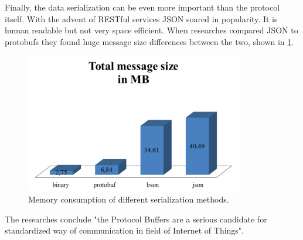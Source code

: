 Finally, the data serialization can be even more important than the protocol itself. With the advent of RESTful services JSON soared in popularity. It is human readable but not very space efficient. When researches compared JSON to protobufs they found huge message size differences between the two, shown in \cref{fig:jsonVsProtobufs}.
\begin{figure}[h!]
    \centering
    \includegraphics[scale=0.45]{figures/jsonVsProtobufs.png}
    \caption{Memory consumption of different serialization methods\cite{}.}
    \label{fig:jsonVsProtobufs}
\end{figure}
The researches conclude "the Protocol Buffers are a serious candidate for standardized way of communication in field of Internet of Things"\cite{jsonVsProtobufs}.